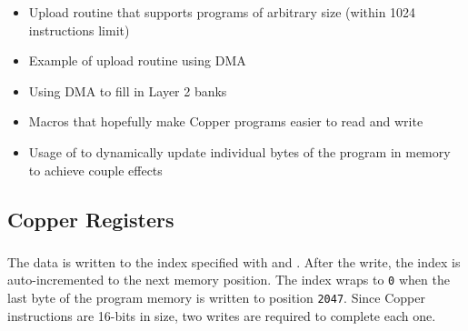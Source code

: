 \begin{itemize}[topsep=1pt,itemsep=1pt]
	\item Upload routine that supports programs of arbitrary size (within 1024 instructions limit)
	\item Example of upload routine using DMA
	\item Using DMA to fill in Layer 2 banks
	\item Macros that hopefully make Copper programs easier to read and write
	\item Usage of  to dynamically update individual bytes of the program in memory to achieve couple effects
\end{itemize}


\pagebreak
\subsection{Copper Registers}
\label{zx_next_copper_registers}


\subsubsection{}

\begin{NextPort}
\end{NextPort}

The data is written to the index specified with  and . After the write, the index is auto-incremented to the next memory position. The index wraps to {\tt 0} when the last byte of the program memory is written to position {\tt 2047}. Since Copper instructions are 16-bits in size, two writes are required to complete each one.


\subsubsection{}

\begin{NextPort}
\end{NextPort}


\subsubsection{}

\begin{NextPort}
\end{NextPort}

